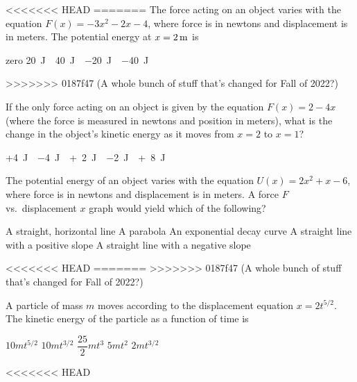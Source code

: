 \documentclass{../../oss-apphys-exam}
\begin{document}
\begin{multicols*}{2}
\begin{questions}
\begin{questions}
<<<<<<< HEAD
=======
    \question The force acting on an object varies with the equation
    $F(x)=-3x^2-2x-4$, where force is in newtons and displacement is in meters.
    The potential energy at $x=\SI2\metre$ is
    \begin{choices}
      \choice zero
      \choice\SI{20}\joule
      \choice\SI{40}\joule
      \choice\SI{-20}\joule
      \choice\SI{-40}\joule
    \end{choices}
>>>>>>> 0187f47 (A whole bunch of stuff that's changed for Fall of 2022?)
    
    \question If the only force acting on an object is given by the equation
    $F(x)=2-4x$ (where the force is measured in newtons and position in meters),
    what is the change in the object's kinetic energy as it moves from $x=2$ to
    $x=1$?
    \begin{choices}
      \choice +\SI{4}\joule
      \choice \SI{-4}\joule
      \choice +\SI{2}\joule
      \choice \SI{-2}\joule
      \choice +\SI{8}\joule
    \end{choices}
    
    \question The potential energy of an object varies with the equation
    $U(x)=2x^2+x-6$, where force is in newtons and displacement is in meters. A
    force $F$ vs.\ displacement $x$ graph would yield which of the following?
    \begin{choices}
      \choice A straight, horizontal line
      \choice A parabola
      \choice An exponential decay curve
      \choice A straight line with a positive slope
      \choice A straight line with a negative slope
    \end{choices}
<<<<<<< HEAD
    \columnbreak
=======
    \vspace{.7in}
>>>>>>> 0187f47 (A whole bunch of stuff that's changed for Fall of 2022?)
    
    \question A particle of mass $m$ moves according to the displacement
    equation $x=2t^{5/2}$. The kinetic energy of the particle as a function of
    time is
    \begin{choices}
      \choice $10mt^{5/2}$
      \choice $10mt^{3/2}$
      \choice $\dfrac{25}2mt^3$
      \choice $5mt^2$
      \choice $2mt^{3/2}$
    \end{choices}
<<<<<<< HEAD
    

\end{questions}
\end{questions}
\end{multicols*}
\end{document}
